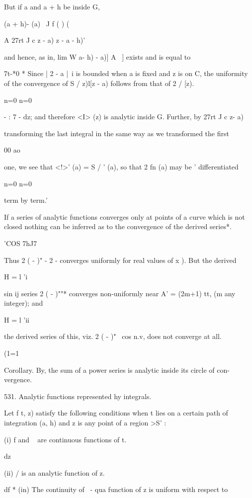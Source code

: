 {{But if a and a + h be inside G,

 (a + h)- (a) \ J f ( ) (

A 27rt J c z - a) z - a - h)'

and hence, as in, lim W a- h) - a)] A~ ] exists and is equal to

7t-*0 * Since | 2 - a |~i is bounded when a is fixed and z is on C,
the uniformity of the convergence of S / z)l[z - a) follows from that
of 2 / [z).

n=0 n=0

%
%

  - : 7 - dz; and therefore <I> (z) is analytic inside G. Further, by
27rt J c z- a)

transforming the last integral in the same way as we transformed the
first

00 ao

one, we see that <!>' (a) = S / ' (a), so that 2 fn (a) may be '
differentiated

n=0 n=0

term by term.'

If a series of analytic functions converges only at points of a curve
which is not closed nothing can be inferred as to the convergence of
the derived series*.

'COS 7hJ7

Thus 2 ( - )" - 2 - converges uniformly for real values of x ).
But the derived

H = l 'i

  sin ij series 2 ( - )""* converges non-uniformly near A' = (2m+1)
tt, (m any integer); and

H = l 'ii

the derived series of this, viz. 2 ( - )"~ cos n.v, does not converge
at all.

(1=1

Corollary. By, the sum of a power series is analytic inside its
circle of con- vergence.

531. Analytic functions represented hy integrals.

Let f t, z) satisfy the following conditions when t lies on a certain
path of integration (a, h) and z is any point of a region >S' :

(i) f and ~ are continuous functions of t.

   dz

(ii) / is an analytic function of z.

df * (in) The continuity of ~- qua function of z is uniform with
respect to

}}
